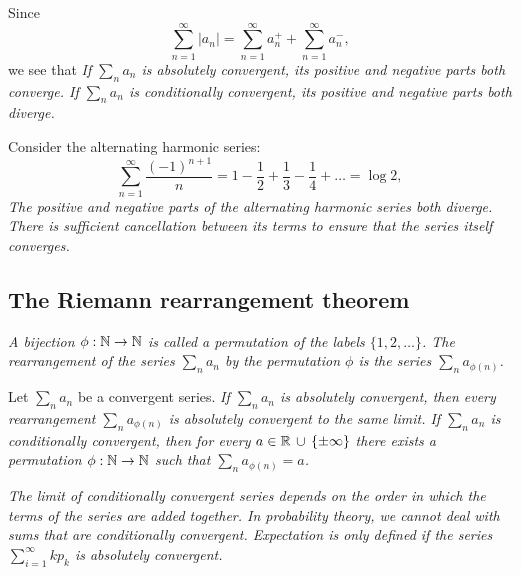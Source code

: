 Since 
\[
\sum_{n=1}^{\infty} |a_n| = \sum_{n=1}^{\infty} a_n^{+} + \sum_{n=1}^{\infty} a_n^{-},
\]
we see that
\ben
\it If $\sum_n a_n$ is absolutely convergent, its positive and negative parts both converge.
\it If $\sum_n a_n$ is conditionally convergent, its positive and negative parts both diverge.
\een

Consider the alternating harmonic series:
\[
\sum_{n=1}^{\infty} \frac{(-1)^{n+1}}{n} = 1 - \frac{1}{2} + \frac{1}{3} - \frac{1}{4} + \ldots = \log 2,
\]
\bit
\it The positive and negative parts of the alternating harmonic series both diverge.
\it There is sufficient cancellation between its terms to ensure that the series itself converges.
\eit

\subsection{The Riemann rearrangement theorem}
\begin{definition}
\ben
\it A bijection $\phi:\mathbb{N}\to\mathbb{N}$ is called a \emph{permutation} of the labels $\{1,2,\ldots\}$. 
\it The \emph{rearrangement} of the series $\sum_n a_n$ by the permutation $\phi$ is the series $\sum_n a_{\phi(n)}$. 
\een
\end{definition}

\begin{theorem}\label{thm:rrt}
Let $\sum_n a_n$ be a convergent series.
\ben
\it If $\sum_n a_n$ is absolutely convergent, then every rearrangement $\sum_n a_{\phi(n)}$ is absolutely convergent to the same limit.
\it If $\sum_n a_n$ is conditionally convergent, then for every $a\in\mathbb{R}\,\cup\,\{\pm\infty\}$ there exists a permutation $\phi:\mathbb{N}\to\mathbb{N}$ such that $\sum_n a_{\phi(n)}=a$.
\een
\end{theorem}
\proofomitted

\bit
\it The limit of conditionally convergent series depends on the \emph{order} in which the terms of the series are added together. 
\it In probability theory, we cannot deal with sums that are conditionally convergent.
\it Expectation is only defined if the series $\sum_{i=1}^{\infty} k p_k$ is absolutely convergent.
\eit



